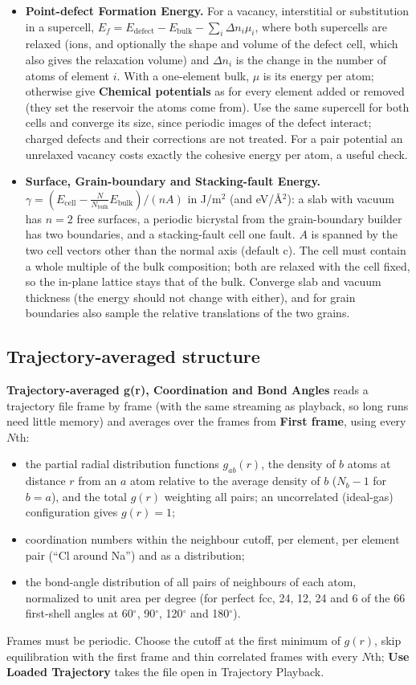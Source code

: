 \begin{itemize}
\item \textbf{Point-defect Formation Energy.} For a vacancy, interstitial or substitution in a supercell, $E_f = E_\mathrm{defect} - E_\mathrm{bulk} - \sum_i \Delta n_i \mu_i$, where both supercells are relaxed (ions, and optionally the shape and volume of the defect cell, which also gives the relaxation volume) and $\Delta n_i$ is the change in the number of atoms of element $i$. With a one-element bulk, $\mu$ is its energy per atom; otherwise give \textbf{Chemical potentials} as  for every element added or removed (they set the reservoir the atoms come from). Use the same supercell for both cells and converge its size, since periodic images of the defect interact; charged defects and their corrections are not treated. For a pair potential an unrelaxed vacancy costs exactly the cohesive energy per atom, a useful check.
\item \textbf{Surface, Grain-boundary and Stacking-fault Energy.} $\gamma = (E_\mathrm{cell} - \tfrac{N}{N_\mathrm{bulk}} E_\mathrm{bulk}) / (n A)$ in J/m$^2$ (and eV/\AA$^2$): a slab with vacuum has $n = 2$ free surfaces, a periodic bicrystal from the grain-boundary builder has two boundaries, and a stacking-fault cell one fault. $A$ is spanned by the two cell vectors other than the normal axis (default c). The cell must contain a whole multiple of the bulk composition; both are relaxed with the cell fixed, so the in-plane lattice stays that of the bulk. Converge slab and vacuum thickness (the energy should not change with either), and for grain boundaries also sample the relative translations of the two grains.
\end{itemize}

\subsection{Trajectory-averaged structure}
\textbf{Trajectory-averaged g(r), Coordination and Bond Angles} reads a trajectory file frame by frame (with the same streaming as playback, so long runs need little memory) and averages over the frames from \textbf{First frame}, using every $N$th:
\begin{itemize}
\item the partial radial distribution functions $g_{ab}(r)$, the density of $b$ atoms at distance $r$ from an $a$ atom relative to the average density of $b$ ($N_b-1$ for $b=a$), and the total $g(r)$ weighting all pairs; an uncorrelated (ideal-gas) configuration gives $g(r)=1$;
\item coordination numbers within the neighbour cutoff, per element, per element pair (``Cl around Na'') and as a distribution;
\item the bond-angle distribution of all pairs of neighbours of each atom, normalized to unit area per degree (for perfect fcc, 24, 12, 24 and 6 of the 66 first-shell angles at 60$^\circ$, 90$^\circ$, 120$^\circ$ and 180$^\circ$).
\end{itemize}
Frames must be periodic. Choose the cutoff at the first minimum of $g(r)$, skip equilibration with the first frame and thin correlated frames with every $N$th; \textbf{Use Loaded Trajectory} takes the file open in Trajectory Playback.

